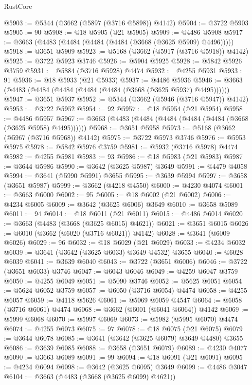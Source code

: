\begin{lexlean}{RustCore}
\begin{coremodule}
@5903 := @5344 (@3662 (@5897 (@3716 @5898)) @4142)
@5904 := @3722 @5903
@5905 := 90
@5908 := @18 @5905 (@21 @5905)
@5909 := @4486 @5908
@5917 := @3663 (@4483 (@4484 (@4484 (@4484 (@3668 (@3625 @5909) @4496)))))
@5918 := @3651 @5909
@5923 := @5168 (@3662 (@5917 (@3716 @5918)) @4142)
@5925 := @3722 @5923 @3746
@5926 := @5904 @5925
@5928 := @5842 @5926 @3759
@5931 := @5884 (@3716 @5928) @4474
@5932 := @4255 @5931
@5933 := 91
@5936 := @18 @5933 (@21 @5933)
@5937 := @4486 @5936
@5946 := @3663 (@4483 (@4484 (@4484 (@4484 (@4484 (@3668 (@3625 @5937) @4495))))))
@5947 := @3651 @5937
@5952 := @5344 (@3662 (@5946 (@3716 @5947)) @4142)
@5953 := @3722 @5952
@5954 := 92
@5957 := @18 @5954 (@21 @5954)
@5958 := @4486 @5957
@5967 := @3663 (@4483 (@4484 (@4484 (@4484 (@4484 (@3668 (@3625 @5958) @4495))))))
@5968 := @3651 @5958
@5973 := @5168 (@3662 (@5967 (@3716 @5968)) @4142)
@5975 := @3722 @5973 @3746
@5976 := @5953 @5975
@5978 := @5842 @5976 @3759
@5981 := @5932 (@3716 @5978) @4474
@5982 := @4255 @5981
@5983 := 93
@5986 := @18 @5983 (@21 @5983)
@5987 := @3644 @5986
@5990 := @3642 (@3625 @5987) @3649
@5991 := @4479 @4058
@5994 := @3641 (@5990 @5991) @3655
@5995 := @3639 @5994
@5997 := @3658 (@3651 @5987)
@5999 := @3662 (@4218 @4550)
@6000 := @4230 @4074
@6001 := @3663 @6000
@6002 := 95
@6005 := @18 @6002 (@21 @6002)
@6006 := @4234 @6005
@6009 := @3642 (@3625 @6006) @3649
@6010 := @3658 @5089
@6011 := 94
@6014 := @18 @6011 (@21 @6011)
@6015 := @4486 @6014
@6020 := @3663 (@4483 (@3668 (@3625 @6015) @4621))
@6021 := @3651 @6015
@6026 := @6010 (@3662 (@6020 (@3716 @6021)) @4142)
@6028 := @3641 (@6009 @6026)
@6029 := 96
@6032 := @18 @6029 (@21 @6029)
@6033 := @4234 @6032
@6039 := @3641 (@3642 (@3625 @6033) @3649 @4532) @3655
@6040 := @6028 @6039
@6041 := @3639 @6040
@6043 := @3722 (@3651 @6006)
@6046 := @3722 (@3651 @6033) @3746
@6047 := @6043 @6046
@6049 := @4259 @6047 @3759
@6050 := @4255 @6049
@6051 := @5090 @3746
@6052 := @5625 @6051
@6054 := @5624 @6052 @3759
@6057 := @6050 (@3716 @6054) @4474
@6058 := @4255 @6057
@6059 := @4118 @5626
@6061 := @5069 @6059 @4547
@6064 := @6058 (@3716 @6061) @4474
@6068 := @3662 (@6001 (@6041 @6064)) @4142
@6069 := @5999 @6068
@6070 := @5997 @6069
@6073 := @5982 (@5995 @6070) @4474
@6074 := @4255 @6073
@6075 := 97
@6078 := @18 @6075 (@21 @6075)
@6079 := @3644 @6078
@6085 := @3641 (@3642 (@3625 @6079) @3649 @4480) @3655
@6086 := @3639 @6085
@6088 := @3658 (@3651 @6079)
@6089 := @4230 @4077
@6090 := @3663 @6089
@6091 := 99
@6094 := @18 @6091 (@21 @6091)
@6095 := @4234 @6094
@6098 := @3642 (@3625 @6095) @3649
@6099 := @4486 @3047
@6104 := @3663 (@4483 (@3668 (@3625 @6099) @4621))

\end{coremodule}
\end{lexlean}
